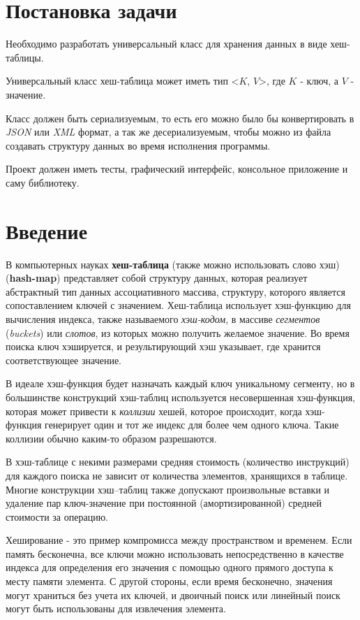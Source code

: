 
\section*{Постановка задачи}
Необходимо разработать универсальный класс для хранения данных в виде хеш-таблицы.

Универсальный класс хеш-таблица может иметь тип <$K$, $V$>, где $K$ - ключ, а $V$ - значение.

Класс должен быть сериализуемым, то есть его можно было бы конвертировать в \textit{JSON} или \textit{XML} формат, а так же десериализуемым, чтобы можно из файла создавать структуру данных во время исполнения программы.

Проект должен иметь тесты, графический интерфейс, консольное приложение и саму библиотеку.

\newpage
\section{Введение}

В компьютерных науках \textbf{хеш-таблица} (также можно использовать слово хэш) (\textbf{hash-map}) представляет собой структуру данных, которая реализует абстрактный тип данных ассоциативного массива, структуру, которого является сопоставлением ключей с значением.
Хеш-таблица использует хэш-функцию для вычисления индекса, также называемого \textit{хэш-кодом}, в массиве \textit{сегментов} (\textit{buckets}) или \textit{слотов}, из которых можно получить желаемое значение. 
Во время поиска ключ хэшируется, и результирующий хэш указывает, где хранится соответствующее значение.

В идеале хэш-функция будет назначать каждый ключ уникальному сегменту, но в большинстве конструкций хэш-таблиц используется несовершенная хэш-функция, которая может привести к \textit{коллизии} хешей, которое происходит, когда хэш-функция генерирует один и тот же индекс для более чем одного ключа. 
Такие коллизии обычно каким-то образом разрешаются.

В хэш-таблице с некими размерами средняя стоимость (количество инструкций) для каждого поиска не зависит от количества элементов, хранящихся в таблице.
Многие конструкции хэш–таблиц также допускают произвольные вставки и удаление пар ключ-значение при постоянной (амортизированной) средней стоимости за операцию.

Хеширование - это пример компромисса между пространством и временем. 
Если память бесконечна, все ключи можно использовать непосредственно в качестве индекса для определения его значения с помощью одного прямого доступа к месту памяти элемента. 
С другой стороны, если время бесконечно, значения могут храниться без учета их ключей, и двоичный поиск или линейный поиск могут быть использованы для извлечения элемента.


